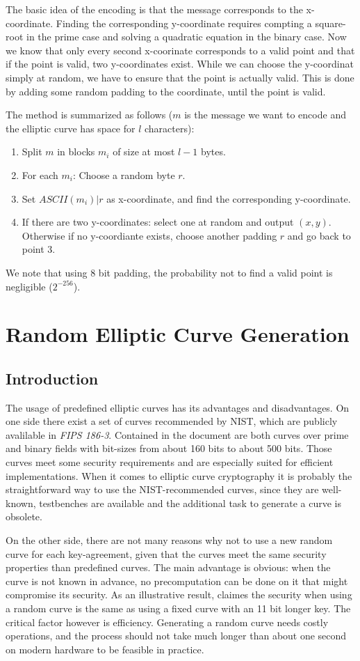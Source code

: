 \documentclass[11pt,english]{article}
\begin{document}
The basic idea of the encoding is that the message corresponds to the x-coordinate. Finding the corresponding y-coordinate requires compting a square-root in the prime case and solving a quadratic equation in the binary case. Now we know that only every second x-coorinate corresponds to a valid point and that if the point is valid, two y-coordinates exist. While we can choose the y-coordinat simply at random, we have to ensure that the point is actually valid. This is done by adding some random padding to the coordinate, until the point is valid.

The method is summarized as follows ($m$ is the message we want to encode and the elliptic curve has space for $l$ characters):
\begin{enumerate}
 \item Split $m$ in blocks $m_i$ of size at most $l-1$ bytes.
 \item For each $m_i$: Choose a random byte $r$.
 \item Set $ASCII(m_i)|r$ as x-coordinate, and find the corresponding y-coordinate.
 \item If there are two y-coordinates: select one at random and output $(x,y)$. Otherwise if no y-coordiante exists, choose another padding $r$ and go back to point 3.
\end{enumerate}
We note that using 8 bit padding, the probability not to find a valid point is negligible ($2^{-256}$).


\section{Random Elliptic Curve Generation}
\subsection{Introduction}
The usage of predefined elliptic curves has its advantages and disadvantages. On one side there exist a set of curves recommended by NIST, which are publicly avalilable in \emph{FIPS 186-3}.
Contained in the document are both curves over prime and binary fields with bit-sizes from about 160 bits to about 500 bits. Those curves meet some security requirements and are especially suited for efficient implementations.
When it comes to elliptic curve cryptography it is probably the straightforward way to use the NIST-recommended curves, since they are well-known, testbenches are available and the additional task to generate a curve is obsolete.

On the other side, there are not many reasons why not to use a new random curve for each key-agreement, given that the curves meet the same security properties than predefined curves.
The main advantage is obvious: when the curve is not known in advance, no precomputation can be done on it that might compromise its security. As an illustrative result, \cite{fixed} claimes the security when using a random curve is the same as using a fixed curve with an 11 bit longer key.
The critical factor however is efficiency. Generating a random curve needs costly operations, and the process should not take much longer than about one second on modern hardware to be feasible in practice.
\end{document}
